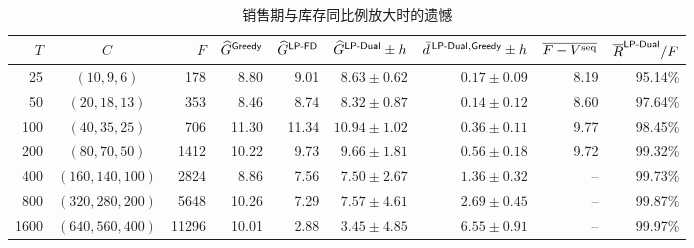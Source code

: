 \begin{table}[htbp]
\centering\footnotesize
\caption{销售期与库存同比例放大时的遗憾}\label{tab:scaling}
\begin{tabular}{rcrrrrrrr}
\toprule
$T$ & $C$ & $F$ & $\widehat G^{\textsf{Greedy}}$ & $\widehat G^{\textsf{LP-FD}}$ & $\widehat G^{\textsf{LP-Dual}}\pm h$ & $\bar d^{\,\textsf{LP-Dual},\textsf{Greedy}}\pm h$ & $\overline{F-V^{\mathrm{seq}}}$ & $\overline R^{\textsf{LP-Dual}}/F$ \\
\midrule
25 & $(10,9,6)$ & 178 & 8.80 & 9.01 & $8.63\pm0.62$ & $0.17\pm0.09$ & 8.19 & 95.14\% \\
50 & $(20,18,13)$ & 353 & 8.46 & 8.74 & $8.32\pm0.87$ & $0.14\pm0.12$ & 8.60 & 97.64\% \\
100 & $(40,35,25)$ & 706 & 11.30 & 11.34 & $10.94\pm1.02$ & $0.36\pm0.11$ & 9.77 & 98.45\% \\
200 & $(80,70,50)$ & 1412 & 10.22 & 9.73 & $9.66\pm1.81$ & $0.56\pm0.18$ & 9.72 & 99.32\% \\
400 & $(160,140,100)$ & 2824 & 8.86 & 7.56 & $7.50\pm2.67$ & $1.36\pm0.32$ & -- & 99.73\% \\
800 & $(320,280,200)$ & 5648 & 10.26 & 7.29 & $7.57\pm4.61$ & $2.69\pm0.45$ & -- & 99.87\% \\
1600 & $(640,560,400)$ & 11296 & 10.01 & 2.88 & $3.45\pm4.85$ & $6.55\pm0.91$ & -- & 99.97\% \\
\bottomrule
\end{tabular}
\par{}
\end{table}
